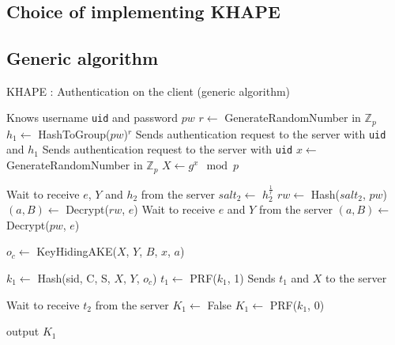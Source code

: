 \documentclass[../report.tex]{subfiles}
\begin{document}
\chapter{}

\section{Choice of implementing KHAPE}

\section{Generic algorithm}


\begin{algorithm}
\caption{KHAPE : Authentication on the client (generic algorithm)}
\label{login_client}
\begin{algorithmic}
\Require Knows username \verb|uid| and password $pw$
    \State $r \gets$ GenerateRandomNumber in $\mathbb{Z}_p$
    \State $h_1 \gets$ HashToGroup($pw$)$^r$
    \State Sends authentication request to the server with \verb|uid| and $h_1$
\Else
    \State Sends authentication request to the server with \verb|uid|
\EndIf
\State $x \gets$ GenerateRandomNumber in $\mathbb{Z}_p$
\State $X \gets g^x \mod p$

    \State Wait to receive $e$, $Y$ and $h_2$ from the server
    \State $salt_2 \gets$ $h_2^{\frac{1}{r}}$
    \State $rw \gets$ Hash($salt_2$, $pw$)
    \State $(a, B) \gets$ Decrypt($rw$, $e$)
\Else
    \State Wait to receive $e$ and $Y$ from the server
    \State $(a, B) \gets$ Decrypt($pw$, $e$)
\EndIf



\State $o_c \gets$ KeyHidingAKE($X$, $Y$, $B$, $x$, $a$)

\State $k_1 \gets$ Hash(sid, C, S, $X$, $Y$, $o_c$)
\State $t_1 \gets$ PRF($k_1$, 1)
\State Sends $t_1$ and $X$ to the server


\State Wait to receive $t_2$ from the server
    \State $K_1 \gets$ False
\Else
    \State $K_1 \gets$ PRF($k_1$, 0)
\EndIf

\State output $K_1$
\end{algorithmic}
\end{algorithm}
\end{document}
